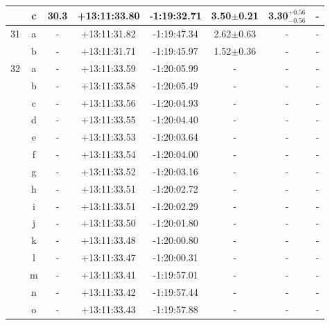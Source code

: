 \documentclass[useAMS,usenatbib]{mn2e}
\begin{document}
\begin{table}
\begin{tabular}{cccccccc}
          & c & 30.3 & +13:11:33.80 & -1:19:32.71 & 3.50$\pm$0.21 & 3.30$^{+0.56}_{-0.56}$ &       -      \\
     \hline
       31 & a &   -  & +13:11:31.82 & -1:19:47.34 & 2.62$\pm$0.63 &          -             &       -      \\
          & b &   -  & +13:11:31.71 & -1:19:45.97 & 1.52$\pm$0.36 &          -             &       -      \\
     \hline
       32 & a &   -  & +13:11:33.59 & -1:20:05.99 &      -        &          -             &       -      \\
          & b &   -  & +13:11:33.58 & -1:20:05.49 &      -        &          -             &       -      \\
          & c &   -  & +13:11:33.56 & -1:20:04.93 &      -        &          -             &       -      \\
          & d &   -  & +13:11:33.55 & -1:20:04.40 &      -        &          -             &       -      \\
          & e &   -  & +13:11:33.53 & -1:20:03.64 &      -        &          -             &       -      \\
          & f &   -  & +13:11:33.54 & -1:20:04.00 &      -        &          -             &       -      \\
          & g &   -  & +13:11:33.52 & -1:20:03.16 &      -        &          -             &       -      \\
          & h &   -  & +13:11:33.51 & -1:20:02.72 &      -        &          -             &       -      \\
          & i &   -  & +13:11:33.51 & -1:20:02.29 &      -        &          -             &       -      \\
          & j &   -  & +13:11:33.50 & -1:20:01.80 &      -        &          -             &       -      \\
          & k &   -  & +13:11:33.48 & -1:20:00.80 &      -        &          -             &       -      \\
          & l &   -  & +13:11:33.47 & -1:20:00.31 &      -        &          -             &       -      \\
          & m &   -  & +13:11:33.41 & -1:19:57.01 &      -        &          -             &       -      \\
          & n &   -  & +13:11:33.42 & -1:19:57.44 &      -        &          -             &       -      \\
          & o &   -  & +13:11:33.43 & -1:19:57.88 &      -        &          -             &       -      \\

\end{tabular}
\end{table}
\end{document}
